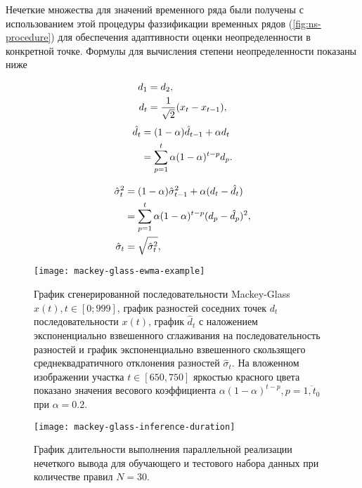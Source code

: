 Нечеткие множества для значений временного ряда были получены с использованием этой процедуры фаззификации временных рядов (\cref{fig:ns-procedure}) для обеспечения адаптивности оценки неопределенности в конкретной точке. Формулы для вычисления степени неопределенности показаны ниже%

\begin{minipage}{0.45\linewidth}
\begin{align}
	\label{eqn:mackey-glass-seq-diff}
	d_1 &= d_2, \notag \\
	d_t &= \frac{1}{\sqrt{2}}(x_t - x_{t-1}),
\end{align}
\begin{align}
	\hat{d}_t &= (1-\alpha) \hat{d}_{t-1} + \alpha d_t \notag \\
	&= \sum_{p=1}^t \alpha (1-\alpha)^{t-p} d_p. %
	\label{eqn:mackey-glass-seq-diff-mean}
\end{align}
\end{minipage}\hfill
\begin{minipage}{0.45\linewidth}
\begin{align}
	\hat{\sigma}^2_t &= (1-\alpha) \hat{\sigma}^2_{t-1} + \alpha (d_t - \hat{d}_t) \notag \\
	&= \sum_{p=1}^t \alpha (1-\alpha)^{t-p} (d_p - \hat{d}_p)^2, \label{eqn:mackey-glass-seq-diff-var-iterative} \\
	\hat{\sigma}_t &= \sqrt{\hat{\sigma}^2_t}, \label{eqn:mackey-glass-seq-diff-std}
\end{align}
\end{minipage}

\begin{figure}[ht]
	\centering
	\texttt{[image: mackey-glass-ewma-example]}
	\caption{График сгенерированной последовательности Mackey-Glass $x(t), t\in[0;999]$, график разностей соседних точек $d_t$ последовательности $x(t)$, график $\hat{d}_t$ с наложением экспоненциально взвешенного сглаживания на последовательность разностей и график экспоненциально взвешенного скользящего среднеквадратичного отклонения разностей $\hat{\sigma}_t$. На вложенном изображении участка $t\in[650,750]$ яркостью красного цвета показано значения весового коэффициента $\alpha (1-\alpha)^{t-p}, p=\overline{1,t_0}$ при $\alpha = 0.2$.}
	\label{fig:mackey-glass-ewma-example}
\end{figure}

\begin{figure}[tbh]
	\centering
	\texttt{[image: mackey-glass-inference-duration]}
	\caption{График длительности выполнения параллельной реализации нечеткого вывода для обучающего и тестового набора данных при количестве правил $N=30$.}
	\label{fig:mackey-glass-inference-duration}
\end{figure}

